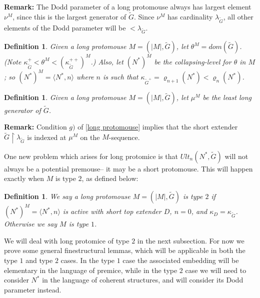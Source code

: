 \documentclass[12pt]{article}
\newtheorem{defn}[thm]{Definition}
\begin{document}
\textbf{Remark:} The Dodd parameter of a long protomouse always has largest element $\nu^M$, since this is the largest generator of $\tilde{G}$.  Since $\nu^M$ has cardinality $\lambda_{\tilde{G}}$, all other elements of the Dodd parameter will be $< \lambda_{\tilde{G}}$.\\



\begin{defn} \label{theta of long protomouse}
Given a long protomouse $M = ( |M| , \tilde{G} )$, let $\theta^M = dom(\tilde{G})$.  (Note $\kappa_{\tilde{G}}^+ < \theta^M < (  \kappa_{\tilde{G}}^{++} )^M$.)  Also, let $(N^* )^M$ be the collapsing-level for $\theta$ in $M$; so $(N^*)^M = \langle N^* , n \rangle$ where $n$ is such that $\kappa_{\tilde{G}^+} = \varrho_{n+1} ( N^* ) < \varrho_n (N^* )$.
\end{defn}

\begin{defn} \label{mu of long protomouse}
Given a long protomouse $M = ( |M| , \tilde{G} )$, let $\mu^M$ be the least long generator of $\tilde{G}$.
\end{defn}

\textbf{Remark:} Condition $g)$ of \ref{long protomouse} implies that the short extender $\tilde{G} \restriction \lambda_{\tilde{G}}$ is indexed at $\mu^M$ on the $M$-sequence.

\bigskip

One new problem which arises for long protomice is that $Ult_n (N^* , \tilde{G} )$ will not always be a potential premouse-- it may be a short protomouse.  This will happen exactly when $M$ is type $2$, as defined below:\\

\begin{defn} \label{long protomouse type}
We say a long protomouse $M = (|M| , \tilde{G})$ is type $2$ if $(N^* )^M = \langle  N^* , n \rangle$ is active with short top extender $D$, $n = 0$, and $\kappa_D = \kappa_{\tilde{G}}$.  Otherwise we say $M$ is type $1$.
\end{defn}

We will deal with long protomice of type $2$ in the next subsection.  For now we prove some general finestructural lemmas, which will be applicable in both the type $1$ and type $2$ cases.  In the type $1$ case the associated embedding will be elementary in the language of premice, while in the type $2$ case we will need to consider $N^*$ in the language of coherent structures, and will consider its Dodd parameter instead.\\
\end{document}
